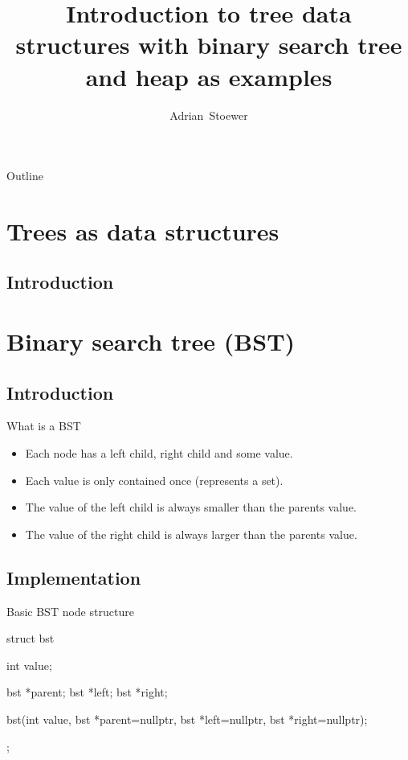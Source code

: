 \documentclass{beamer}
\title[BST and Heaps] 
{
    Introduction to tree data structures with binary search tree 
    and heap as examples
}
\author[Adrian Stoewer]{
    Adrian~Stoewer
}
\begin{document}
\begin{frame}
  \titlepage
\end{frame}

\begin{frame}{Outline}
  \tableofcontents
\end{frame}


\section{Trees as data structures}

\subsection{Introduction}


\section{Binary search tree (BST)}

\subsection{Introduction}

\begin{frame}[t]{What is a BST}
    \begin{itemize}
        \item Each node has a left child, right child and some value.
        \item Each value is only contained once (represents a set).
        \item The value of the left child is always smaller than the parents value.
        \item The value of the right child is always larger than the parents value. 
    \end{itemize}
\end{frame}


\subsection{Implementation}

\begin{frame}[fragile]{Basic BST node structure}
\begin{cppcode}
struct bst {
    int value;

    bst *parent;
    bst *left;
    bst *right;

    bst(int value, bst *parent=nullptr, bst *left=nullptr, 
        bst *right=nullptr);
};
\end{cppcode}
\end{frame}
\end{document}
